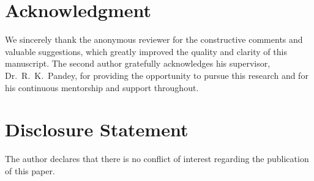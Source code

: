 \documentclass[12pt,a4paper]{article}
\theoremstyle{definition}
\theoremstyle{remark}
\newenvironment{acknowledgment}{
	\section*{Acknowledgment}
}{}
\begin{document}
 


\begin{acknowledgment}
	We sincerely thank the anonymous reviewer for the constructive comments 
	and valuable suggestions, which greatly improved the quality and clarity of 
	this manuscript.
	The second author gratefully acknowledges his supervisor, Dr.~R.~K.~Pandey, for providing the opportunity to pursue this research and for his continuous mentorship and support throughout. 
	
	
\end{acknowledgment}


\section*{Disclosure Statement}
The author declares that there is no conflict of interest regarding the publication of this paper.



	
\end{document}
